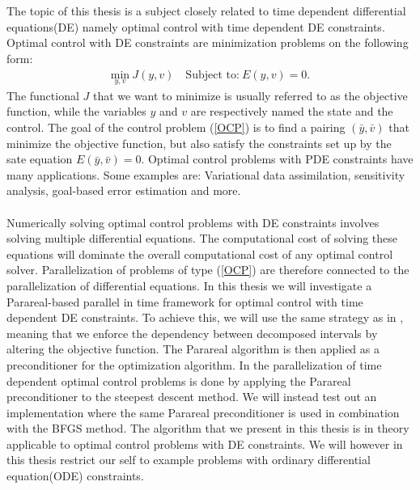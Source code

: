 \\
\\
The topic of this thesis is a subject closely related to time dependent differential equations(DE) namely optimal control with time dependent DE constraints. Optimal control with DE constraints are minimization problems on the following form:
\begin{align}
\underset{y,v}{\text{min}} \ J(y,v) \quad \textrm{Subject to:} \ E(y,v)=0. \label{OCP}
\end{align}
The functional $J$ that we want to minimize is usually referred to as the objective function, while the variables $y$ and $v$ are respectively named the state and the control. The goal of the control problem (\ref{OCP}) is to find a pairing $(\bar y,\bar v)$ that minimize the objective function, but also satisfy the constraints set up by the sate equation $ E(\bar y,\bar v)=0$. Optimal control problems with PDE constraints have many applications. Some examples are: Variational data assimilation, sensitivity analysis, goal-based error estimation and more.
\\
\\
Numerically solving optimal control problems with DE constraints involves solving multiple differential equations. The computational cost of solving these equations will dominate the overall computational cost of any optimal control solver. Parallelization of problems of type (\ref{OCP}) are therefore connected to the parallelization of differential equations. In this thesis we will investigate a Parareal-based parallel in time framework for optimal control with time dependent DE constraints. To achieve this, we will use the same strategy as in \cite{maday2002parareal}, meaning that we enforce the dependency between decomposed intervals by altering the objective function. The Parareal algorithm is then applied as a preconditioner for the optimization algorithm. In \cite{maday2002parareal} the parallelization of time dependent optimal control problems is done by applying the Parareal preconditioner to the steepest descent method. We will instead test out an implementation where the same Parareal preconditioner is used in combination with the BFGS method. The algorithm that we present in this thesis is in theory applicable to optimal control problems with DE constraints. We will however in this thesis restrict our self to example problems with ordinary differential equation(ODE) constraints.

